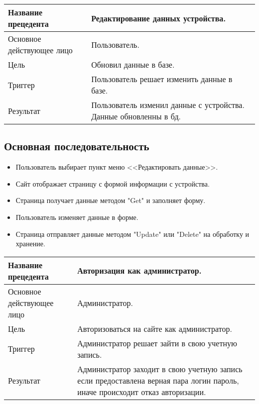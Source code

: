 \begin{center}
    \begin{tabularx}{\textwidth}{|X|X|} \hline
    Название прецедента       & Редактирование данных устройства.\\ \hline
    Основное действующее лицо & Пользователь.\\ \hline
    Цель                      & Обновил данные в базе.\\ \hline
    Триггер                   & Пользователь решает изменить данные в базе.\\ \hline
    Результат                 & Пользователь изменил данные с устройства. Данные обновленны в бд.\\ \hline
    \end{tabularx}
\end{center}

\subsection{Основная последовательность}
\begin{itemize}
    \item Пользователь выбирает пункт меню <<Редактировать данные>>.
    \item Сайт отображает страницу с формой информации с устройства.
    \item Страница получает данные методом "Get" и заполняет форму. 
    \item Пользователь изменяет данные в форме.
    \item Страница отправляет данные методом "Update" или "Delete" на обработку и хранение. 
\end{itemize}

\begin{center}
    \begin{tabularx}{\textwidth}{|X|X|} \hline
    Название прецедента       & Авторизация как администратор.\\ \hline
    Основное действующее лицо & Администратор.\\ \hline
    Цель                      & Авторизоваться на сайте как администратор.\\ \hline
    Триггер                   & Администратор решает зайти в свою учетную запись.\\ \hline
    Результат                 & Администратор заходит в свою учетную запись если предоставлена верная пара логин пароль, иначе происходит отказ авторизации. \\ \hline
    \end{tabularx}
\end{center}


